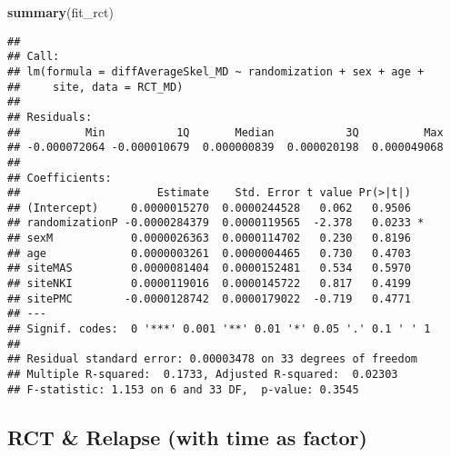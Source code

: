 \documentclass[]{article}
\newenvironment{Shaded}{\begin{snugshade}}{\end{snugshade}}
\newcommand{\KeywordTok}[1]{\textcolor[rgb]{0.13,0.29,0.53}{\textbf{#1}}}
\newcommand{\NormalTok}[1]{#1}
\theoremstyle{definition}
\theoremstyle{definition}
\theoremstyle{definition}
\theoremstyle{remark}
\begin{document}
\begin{Shaded}
\begin{Highlighting}[]
\KeywordTok{summary}\NormalTok{(fit_rct)}
\end{Highlighting}
\end{Shaded}

\begin{verbatim}
## 
## Call:
## lm(formula = diffAverageSkel_MD ~ randomization + sex + age + 
##     site, data = RCT_MD)
## 
## Residuals:
##          Min           1Q       Median           3Q          Max 
## -0.000072064 -0.000010679  0.000000839  0.000020198  0.000049068 
## 
## Coefficients:
##                     Estimate    Std. Error t value Pr(>|t|)  
## (Intercept)     0.0000015270  0.0000244528   0.062   0.9506  
## randomizationP -0.0000284379  0.0000119565  -2.378   0.0233 *
## sexM            0.0000026363  0.0000114702   0.230   0.8196  
## age             0.0000003261  0.0000004465   0.730   0.4703  
## siteMAS         0.0000081404  0.0000152481   0.534   0.5970  
## siteNKI         0.0000119016  0.0000145722   0.817   0.4199  
## sitePMC        -0.0000128742  0.0000179022  -0.719   0.4771  
## ---
## Signif. codes:  0 '***' 0.001 '**' 0.01 '*' 0.05 '.' 0.1 ' ' 1
## 
## Residual standard error: 0.00003478 on 33 degrees of freedom
## Multiple R-squared:  0.1733, Adjusted R-squared:  0.02303 
## F-statistic: 1.153 on 6 and 33 DF,  p-value: 0.3545
\end{verbatim}

\subsection{RCT \& Relapse (with time as
factor)}\label{rct-relapse-with-time-as-factor-3}
\end{document}
